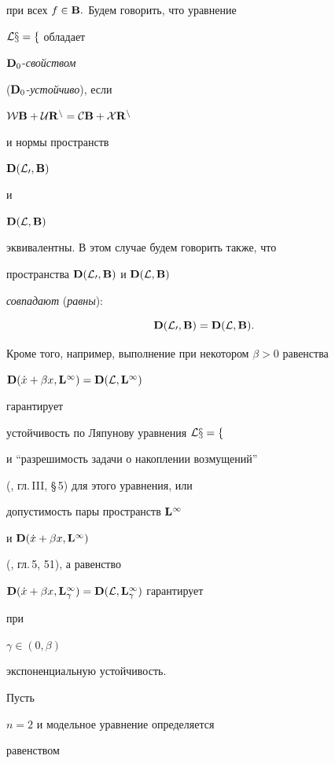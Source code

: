 при всех $f\in{\bold B}.$ Будем говорить, что уравнение


$\cal Lx = f$ обладает


$\bold D_0$-{\it свойством}


($\bold D_0$-{\it устойчиво}), если


$\cal W\bold B + \cal U\bold R^n = \cal C\bold B + \cal X\bold R^n$


и нормы пространств


$\bold D(\cal L_0,\bold B)$


и


$\bold D(\cal L,\bold B)$


эквивалентны. В этом случае будем говорить также, что


пространства $\bold D(\cal L_0,\bold B)$ и $\bold D(\cal L,\bold B)$


{\it совпадают} ({\it равны}):


$$


\spc D(\cal L_0,\spc B)= \spc D(\cal L,\spc B).


$$





Кроме того, например, выполнение при некотором $\beta > 0$ равенства


$\bold D(\Dot x +\beta x,\bold L^\infty) = \bold D(\cal L,\bold L^\infty)$


гарантирует


устойчивость по Ляпунову уравнения $\cal L x = f$


и ``разрешимость задачи о накоплении возмущений''


(\cite{Bar}, гл.\,III, \S\,5) для этого уравнения, или


допустимость пары пространств $\bold L^\infty$


и $\bold D(\Dot x+\beta x,\bold L^\infty)$


(\cite{Mass}, гл.\,5, 51), а равенство


$\spc D(\Dot x +\beta x,\spc L^\infty_\gamma) =


\spc D(\cal L,\spc L^\infty_\gamma)$ гарантирует


при


$\gamma\in(0,\beta)$


экспоненциальную устойчивость.





Пусть


$n = 2$ и модельное уравнение определяется


равенством


